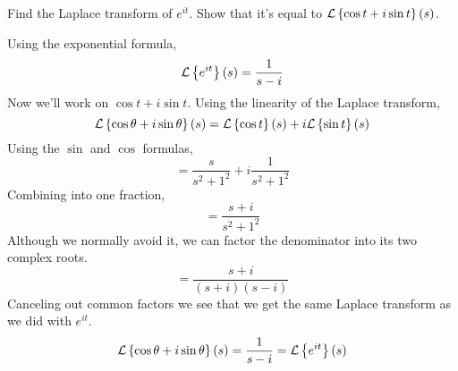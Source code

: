 \begin{example}
	Find the Laplace transform of $e^{it}$. Show that it's equal to $\mathcal{L}\left\{ \cos{t} + i\sin{t} \right\}\left(s\right)$.
\end{example}
Using the exponential formula,
\begin{equation*}
	\mathcal{L}\left\{ e^{it} \right\}\left(s\right) = \frac{1}{s - i}
\end{equation*}
Now we'll work on $\cos{t} + i\sin{t}$. Using the linearity of the Laplace transform,
\begin{equation*}
	\mathcal{L}\left\{ \cos{\theta} + i\sin{\theta} \right\}\left(s\right) = \mathcal{L}\left\{ \cos{t} \right\}\left(s\right) + i\mathcal{L}\left\{ \sin{t} \right\}\left(s\right)
\end{equation*}
Using the $\sin$ and $\cos$ formulas,
\begin{equation*}
	= \frac{s}{s^2 + 1^2} + i\frac{1}{s^2 + 1^2}
\end{equation*}
Combining into one fraction,
\begin{equation*}
	= \frac{s+i}{s^2 + 1^2}
\end{equation*}
Although we normally avoid it, we can factor the denominator into its two complex roots.
\begin{equation*}
	= \frac{s+i}{(s+i)(s-i)}
\end{equation*}
Canceling out common factors we see that we get the same Laplace transform as we did with $e^{it}$.
\begin{equation*}
		\mathcal{L}\left\{ \cos{\theta} + i\sin{\theta} \right\}\left(s\right) = \frac{1}{s-i} = \mathcal{L}\left\{ e^{it} \right\}\left(s\right)
\end{equation*}
